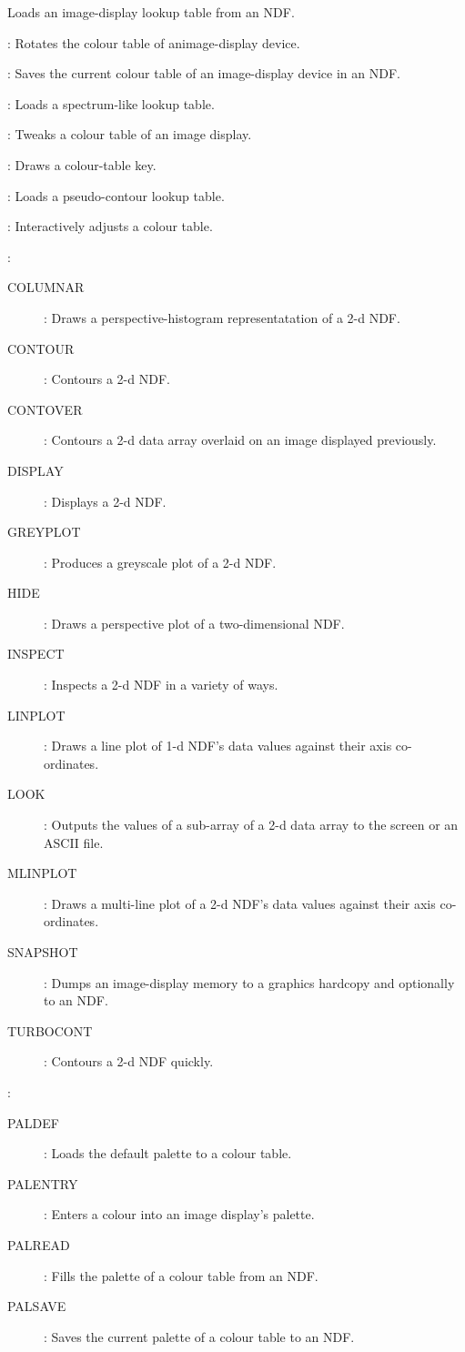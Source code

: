 {\begin{small}
\begin{description}
\begin{description}
\begin{description}
 Loads an image-display lookup table from an NDF.
\item [LUTROT]:
 Rotates the colour table of animage-display device.
\item [LUTSAVE]:
 Saves the current colour table of an image-display device in an NDF.
\item [LUTSPEC]:
 Loads a spectrum-like lookup table.
\item [LUTTWEAK]:
 Tweaks a colour table of an image display.
\item [LUTVIEW]:
 Draws a colour-table key.
\item [LUTZEBRA]:
 Loads a pseudo-contour lookup table.
\item [TWEAK]:
 Interactively adjusts a colour table.
\end{description}
\item [Output] :
\begin{description}
\item [COLUMNAR]:
 Draws a perspective-histogram representatation of a 2-d NDF.
\item [CONTOUR]:
 Contours a 2-d NDF.
\item [CONTOVER]:
 Contours a 2-d data array overlaid on an image displayed previously.
\item [DISPLAY]:
 Displays a 2-d NDF.
\item [GREYPLOT]:
 Produces a greyscale plot of a 2-d NDF.
\item [HIDE]:
 Draws a perspective plot of a two-dimensional NDF.
\item [INSPECT]:
 Inspects a 2-d NDF in a variety of ways.
\item [LINPLOT]:
 Draws a line plot of 1-d NDF's data values against their axis
 co-ordinates.
\item [LOOK]:
 Outputs the values of a sub-array of a 2-d data array to the screen or an
 ASCII file.
\item [MLINPLOT]:
 Draws a multi-line plot of a 2-d NDF's data values against their axis
 co-ordinates.
\item [SNAPSHOT]:
 Dumps an image-display memory to a graphics hardcopy and
 optionally to an NDF.
\item [TURBOCONT]:
 Contours a 2-d NDF quickly.
\end{description}
\item [Palette]:
\begin{description}
\item [PALDEF]:
 Loads the default palette to a colour table.
\item [PALENTRY]:
 Enters a colour into an image display's palette.
\item [PALREAD]:
 Fills the palette of a colour table from an NDF.
\item [PALSAVE]:
 Saves the current palette of a colour table to an NDF.
\end{description}
\end{description}


\end{description}
\end{small}}
